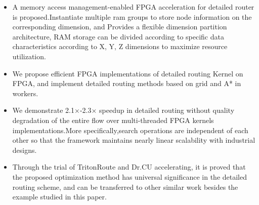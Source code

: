 \begin{itemize}
    \item A memory access management-enabled FPGA acceleration for detailed router is proposed.Instantiate multiple ram groups to store node information on the corresponding dimension, and Provides a flexible dimension partition architecture, RAM storage can be divided according to specific data characteristics according to X, Y, Z dimensions to maximize resource utilization.
    \item We propose efficient FPGA implementations of detailed routing Kernel on FPGA, and implement detailed routing methods based on grid and A* in workers.
    \item We demonstrate 2.1$\times$-2.3$\times$ speedup in detailed routing without quality degradation of the entire flow over multi-threaded FPGA kernels implementations.More specifically,search operations are independent of each other so that the framework maintains nearly linear scalability with industrial designs.
    \item Through the trial of TritonRoute and Dr.CU accelerating, it is proved that the proposed optimization method has universal significance in the detailed routing scheme, and can be transferred to other similar work besides the example studied in this paper.
\end{itemize}




